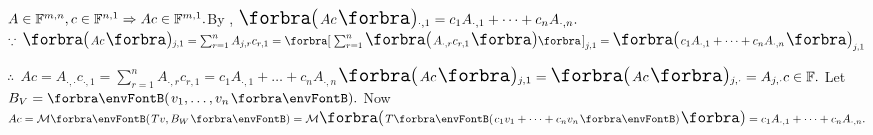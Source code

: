 \BulletPointX\NoteForSmall{[3.52]}\;\;$A\in{\mathbb{F}}^{m,n},c\in{\mathbb{F}}^{n,1}\Rightarrow Ac\in{\mathbb{F}}^{m,1}.$\hfill By , $\BigPar{Ac}{_{\cdot,1}}=c_1A_{\cdot,1}+\dots+c_nA_{\cdot,n}.$\;\;\!\,\PfEnd\vspace{4pt}\quad
\Or $\because\;\BigPar{Ac}{_{j,1}}=\sum_{r=1}^n A_{j,r}c_{r,1}=\BigSbra{\sum_{r=1}^n\BigPar{A_{\cdot,r}c_{r,1}}}_{j,1}=\BigPar{c_1 A_{\cdot,1}+\dots+c_n A_{\cdot,n}}_{j,1}$\vspace{1pt}\par\quad
\Blind{\Or}$\therefore\;\,Ac=A_{\cdot,\cdot}c_{\cdot,1}=\sum_{r=1}^n A_{\cdot,r}c_{r,1}=c_1 A_{\cdot,1}+\dots+c_n A_{\cdot,n}$\;\;\Or $\BigPar{Ac}{_{j,1}}=\BigPar{Ac}{_{j,\cdot}}=A_{j,\cdot}c\in\Fbb.$\PfEnd\vspace{2pt}\quad
\Or Let $B_V=\Par{v_1,\dots,v_n}.$ Now $Ac=\Mt{Tv,B_W}=\Mt[\BigPar]{T\Par{c_1v_1+\dots+c_nv_n}}=c_1A_{\cdot,1}+\dots+c_nA_{\cdot,n}.$\PfEnd
\SepLine

